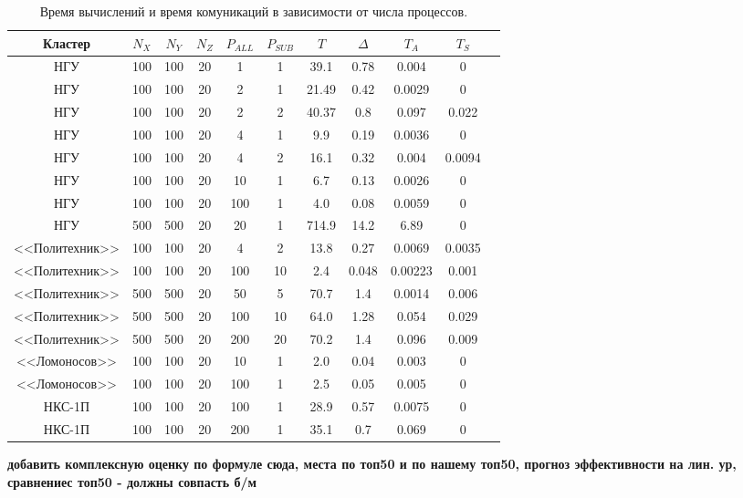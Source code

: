 \begin{table}[ht]
\begin{center}
\caption{Время вычислений и время комуникаций в зависимости от числа  процессов.}
\begin{tabular}{|c|c|c|c|c|c|c|c|c|c|c|}
\hline			
Кластер & $N_X$ & $N_Y$ & $N_Z$ &$P_{ALL}$  & $P_{SUB}$ & $T$ & $\Delta$ & $T_{A}$ &  $T_{S}$ \\\hline
НГУ     & 100   & 100   & 20    &  1        & 1         & 39.1  & 0.78 & 0.004         & 0          \\\hline
НГУ     & 100   & 100   & 20    &  2        & 1         & 21.49 & 0.42 & 0.0029         & 0         \\\hline
НГУ     & 100   & 100   & 20    &  2        & 2         & 40.37 & 0.8 & 0.097         & 0.022       \\\hline
НГУ     & 100   & 100   & 20    &  4        & 1         & 9.9 & 0.19 & 0.0036         & 0           \\\hline
НГУ     & 100   & 100   & 20    &  4        & 2         & 16.1 & 0.32 & 0.004         & 0.0094      \\\hline
НГУ     & 100   & 100   & 20    &  10       & 1         & 6.7 & 0.13 & 0.0026         & 0      \\\hline
НГУ     & 100   & 100   & 20    &  100      & 1         & 4.0   & 0.08 & 0.0059         & 0      \\\hline
НГУ     & 500   & 500   & 20    &  20       & 1         & 714.9 & 14.2 & 6.89         & 0      \\\hline
<<Политехник>> & 100   & 100   & 20    &  4       & 2         & 13.8 & 0.27 & 0.0069         & 0.0035      \\\hline
<<Политехник>> & 100   & 100   & 20    &  100     & 10        & 2.4 & 0.048 & 0.00223        & 0.001      \\\hline
<<Политехник>> & 500   & 500   & 20    &  50       & 5        & 70.7 & 1.4 & 0.0014         & 0.006      \\\hline
<<Политехник>> & 500   & 500   & 20    &  100       & 10      & 64.0 & 1.28 & 0.054         & 0.029      \\\hline
<<Политехник>> & 500   & 500   & 20    &  200       & 20      & 70.2 & 1.4 & 0.096          & 0.009      \\\hline
<<Ломоносов>> & 100   & 100   & 20    &  10       & 1         & 2.0 & 0.04 & 0.003         & 0      \\\hline
<<Ломоносов>> & 100   & 100   & 20    &  100       & 1        & 2.5 & 0.05 & 0.005         & 0      \\\hline
НКС-1П        & 100   & 100   & 20    &  100       & 1        & 28.9 & 0.57 & 0.0075         & 0      \\\hline
НКС-1П        & 100   & 100   & 20    &  200       & 1        & 35.1 & 0.7 & 0.069         & 0      \\\hline

\end{tabular}
\end{center}
\end{table}
\textbf{добавить комплексную оценку по формуле сюда, места по топ50 и по нашему топ50, прогноз эффективности на лин. ур, сравнениес топ50 - должны совпасть б/м}

